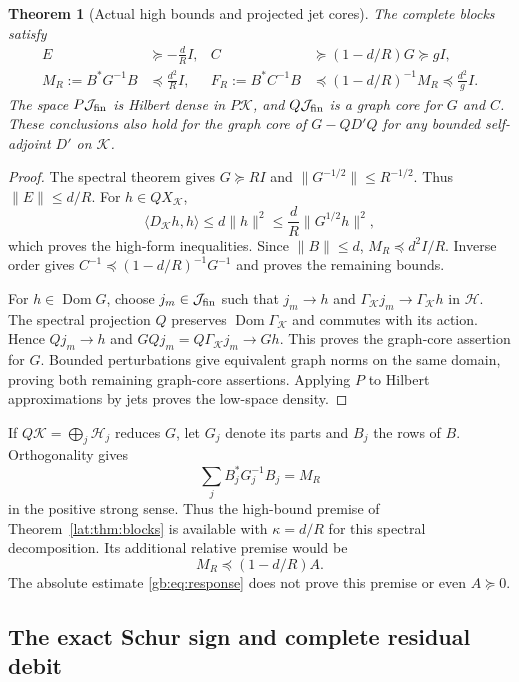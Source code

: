 \documentclass[11pt,a4paper]{article}
\numberwithin{equation}{section}
\newtheorem{theorem}{Theorem}[section]
\theoremstyle{definition}\newtheorem{definition}[theorem]{Definition}
\theoremstyle{remark}\newtheorem{remark}[theorem]{Remark}
\newcommand{\Hh}{\mathcal H}\newcommand{\Hw}{\mathcal H}
\newcommand{\dom}{\operatorname{Dom}}\newcommand{\Var}{\operatorname{Var}}
\newcommand{\ip}[2]{\langle#1,#2\rangle}\newcommand{\norm}[1]{\lVert#1\rVert}\newcommand{\abs}[1]{\lvert#1\rvert}
\newcommand{\Kk}{\mathcal K}\newcommand{\Aa}{\mathcal A}\newcommand{\Ff}{\mathcal F}
\begin{document}
\begin{theorem}[Actual high bounds and projected jet cores]
\label{gb:thm:high}
The complete blocks satisfy
\begin{align}
 E&\succeq-\frac dR I,&
 C&\succeq(1-d/R)G\succeq gI,\label{gb:eq:high}\\
 M_R:=B^*G^{-1}B&\preceq\frac{d^2}{R}I,&
 F_R:=B^*C^{-1}B&\preceq(1-d/R)^{-1}M_R
                     \preceq\frac{d^2}{g}I.\label{gb:eq:response}
\end{align}
The space $P\mathcal J_{\rm fin}$ is Hilbert dense in $P\Kk$, and
$Q\mathcal J_{\rm fin}$ is a graph core for $G$ and $C$.
These conclusions also hold for the graph core of
$G-QD'Q$ for any bounded self-adjoint $D'$ on $\Kk$.
\end{theorem}
\begin{proof}
The spectral theorem gives $G\succeq RI$ and
$\norm{G^{-1/2}}\le R^{-1/2}$. Thus $\norm E\le d/R$.
For $h\in QX_\Kk$,
\[
 \ip{D_\Kk h}{h}\le d\norm h^2
       \le\frac dR\norm{G^{1/2}h}^2,
\]
which proves the high-form inequalities. Since $\norm B\le d$,
$M_R\preceq d^2I/R$. Inverse order gives
$C^{-1}\preceq(1-d/R)^{-1}G^{-1}$ and proves the remaining bounds.

For $h\in\dom G$, choose $j_m\in\mathcal J_{\rm fin}$ such that
$j_m\to h$ and $\Gamma_\Kk j_m\to\Gamma_\Kk h$ in $\Hh$.
The spectral projection $Q$ preserves $\dom\Gamma_\Kk$ and commutes
with its action. Hence $Qj_m\to h$ and
$GQj_m=Q\Gamma_\Kk j_m\to Gh$. This proves the graph-core assertion
for $G$. Bounded perturbations give equivalent graph norms on the same
domain, proving both remaining graph-core assertions. Applying $P$ to
Hilbert approximations by jets proves the low-space density.
\end{proof}

If $Q\Kk=\bigoplus_j\mathcal H_j$ reduces $G$, let $G_j$ denote
its parts and $B_j$ the rows of $B$. Orthogonality gives
\[
 \sum_j B_j^*G_j^{-1}B_j=M_R
\]
in the positive strong sense. Thus the high-bound premise of
Theorem~\ref{lat:thm:blocks} is available with $\kappa=d/R$ for this
spectral decomposition. Its additional relative premise would be
\begin{equation}\label{gb:eq:relative}
 M_R\preceq(1-d/R)A.
\end{equation}
The absolute estimate \eqref{gb:eq:response} does not prove this premise
or even $A\succeq0$.

\subsection{The exact Schur sign and complete residual debit}
\end{document}

